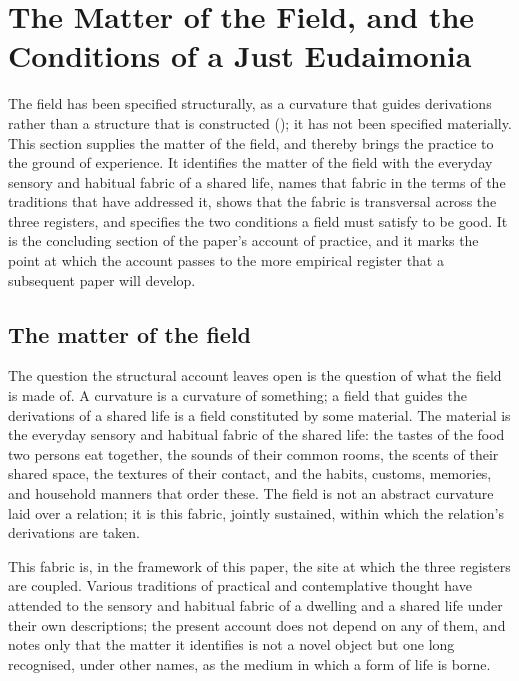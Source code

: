 \section{The Matter of the Field, and the Conditions of a Just Eudaimonia}
\label{p10:sec:fieldmatter}

\noindent
The field has been specified structurally, as a curvature that guides derivations rather than a structure that is constructed (); it has not been specified materially. This section supplies the matter of the field, and thereby brings the practice to the ground of experience. It identifies the matter of the field with the everyday sensory and habitual fabric of a shared life, names that fabric in the terms of the traditions that have addressed it, shows that the fabric is transversal across the three registers, and specifies the two conditions a field must satisfy to be good. It is the concluding section of the paper's account of practice, and it marks the point at which the account passes to the more empirical register that a subsequent paper will develop.

\subsection{The matter of the field}
\label{p10:sec:fm-matter}

The question the structural account leaves open is the question of what the field is made of. A curvature is a curvature of something; a field that guides the derivations of a shared life is a field constituted by some material. The material is the everyday sensory and habitual fabric of the shared life: the tastes of the food two persons eat together, the sounds of their common rooms, the scents of their shared space, the textures of their contact, and the habits, customs, memories, and household manners that order these. The field is not an abstract curvature laid over a relation; it is this fabric, jointly sustained, within which the relation's derivations are taken.

This fabric is, in the framework of this paper, the site at which the three registers are coupled. Various traditions of practical and contemplative thought have attended to the sensory and habitual fabric of a dwelling and a shared life under their own descriptions; the present account does not depend on any of them, and notes only that the matter it identifies is not a novel object but one long recognised, under other names, as the medium in which a form of life is borne.

